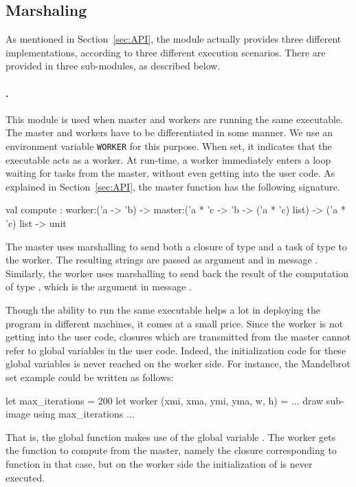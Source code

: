 \documentclass{llncs}
\begin{document}
\subsection{Marshaling}

  As mentioned in Section~\ref{sec:API}, the  module
  actually provides three different implementations, according to
  three different execution scenarios. There are provided in three
  sub-modules, as described below.

  \paragraph{.} This module is used when master and workers
  are running the same executable. The master and workers have to be
  differentiated in some manner. We use an environment variable
  \texttt{WORKER} for this purpose. When set, it indicates that the
  executable acts as a worker. At run-time, a worker immediately
  enters a loop waiting for tasks from the master, without even
  getting into the user code.  As explained in Section~\ref{sec:API},
  the master function has the following signature.
  \begin{ocaml}
  val compute : 
    worker:('a -> 'b) -> master:('a * 'c -> 'b -> ('a * 'c) list) -> 
    ('a * 'c) list -> unit
  \end{ocaml}
  The master uses marshalling to send both a closure of type  and a task of type  to the worker. The resulting
  strings are passed as argument  and  in message
  . Similarly, the worker uses marshalling to send back the
  result of the computation of type , which is the argument
   in message .

  Though the ability to run the same executable helps a lot in
  deploying the program in different machines, it comes at a small
  price. Since the worker is not getting into the user code, closures
  which are transmitted from the master cannot refer to global
  variables in the user code. Indeed, the initialization code for
  these global variables is never reached on the worker side. For
  instance, the Mandelbrot set example could be written as follows:
  \begin{ocaml}
    let max_iterations = 200 
    let worker (xmi, xma, ymi, yma, w, h) = 
      ... draw sub-image using max_iterations ...
  \end{ocaml}
  That is, the global function  makes use of the global
  variable . The worker gets the function to
  compute from the master, namely the closure corresponding to
  function  in that case, but on the worker side the
  initialization of  is never executed.
\end{document}
